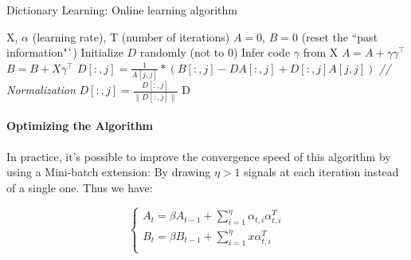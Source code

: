 \begin{algorithm}
 \caption{Dictionary Learning: Online learning algorithm}
 \begin{algorithmic}
  \REQUIRE X, $\alpha$ (learning rate), T (number of iterations)
  \STATE $A = 0$, $B = 0$ (reset the ``past information"`)
  \STATE Initialize $D$ randomly (not to 0)
    \STATE Infer code $\gamma$ from X
    \STATE $A = A + \gamma \gamma^{\intercal}$
    \STATE $B = B + X \gamma^{\intercal}$
            \STATE $ D[:,j] = \frac{1}{A[j,j]}*(B[:,j] - D A[:,j] + D[:,j] A[j,j])$
            \STATE \textit{// Normalization}
            \STATE $D[:,j] = \frac{D[:,j]}{\|D[:,j]\|} $
        \ENDFOR
    \ENDFOR
  \ENDFOR
  \RETURN D
 \end{algorithmic}
\end{algorithm}


\paragraph{Optimizing the Algorithm}
In practice, it's possible to improve the convergence speed of this algorithm by using a Mini-batch extension: By drawing $\eta > 1 $ signals at each iteration instead of a single one. Thus we have:
\begin{center}
  \[    \left\{
                \begin{array}{ll}
                  A_t  = \beta A_{t-1} + \sum_{i=1}^{\eta} \alpha_{t,i}\alpha_{t,i}^{T}\\
                  B_t = \beta B_{t-1} + \sum_{i=1}^{\eta}x\alpha_{t,i}^{T}\\
                \end{array}
              \right.
  \]
\end{center}

